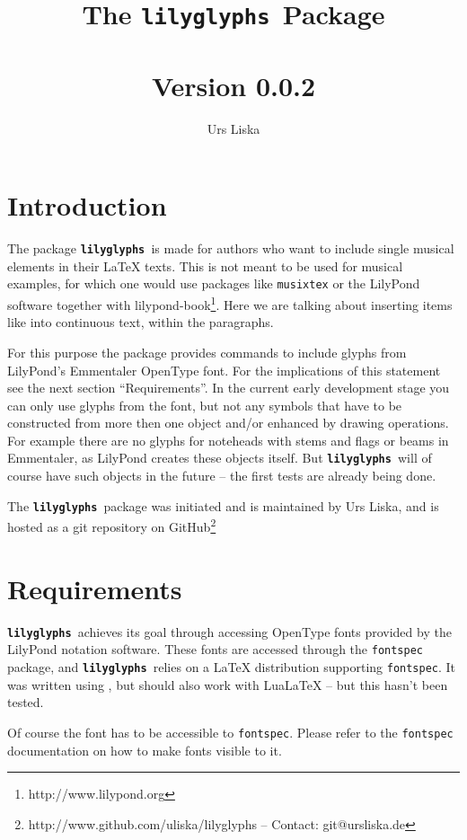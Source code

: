 \documentclass{article}
\newcommand{\lilyglyphs}{\texttt{\textbf{lilyglyphs\,}}}
\begin{document}
\title{The \lilyglyphs Package\\~\\
	\normalsize Version 0.0.2}
\author{Urs Liska}

\maketitle
\tableofcontents


\section{Introduction}
The package \lilyglyphs is made for authors who want to include single musical elements in their \LaTeX{} texts. 
This is not meant to be used for musical examples, for which one would use packages like \texttt{musixtex} or the LilyPond software together with lilypond-book\footnote{http://www.lilypond.org}. 
Here we are talking about inserting items like \lilyRFZ* into continuous text, within the paragraphs.

For this purpose the package provides commands to include glyphs from LilyPond's Emmentaler OpenType font. 
For the implications of this statement see the next section \enquote{Requirements}. 
In the current early development stage you can only use glyphs from the font, but not any symbols that have to be constructed from more then one object and/or enhanced by drawing operations. 
For example there are no glyphs for noteheads with stems and flags or beams in Emmentaler, as LilyPond creates these objects itself. 
But \lilyglyphs will of course have such objects in the future -- the first tests are already being done.

The \lilyglyphs package was initiated and is maintained by Urs Liska, and is hosted as a git repository on GitHub\footnote{http://www.github.com/uliska/lilyglyphs -- Contact: git@ursliska.de}

\section{Requirements}
\lilyglyphs achieves its goal through accessing OpenType fonts provided by the LilyPond notation software. 
These fonts are accessed through the \texttt{fontspec} package, and \lilyglyphs relies on a \LaTeX{} distribution supporting \texttt{fontspec}. 
It was written using \XeLaTeX, but should also work with LuaLaTeX -- but this hasn't been tested.

Of course the font has to be accessible to \texttt{fontspec}. 
Please refer to the \texttt{fontspec} documentation on how to make fonts visible to it. 
\end{document}
